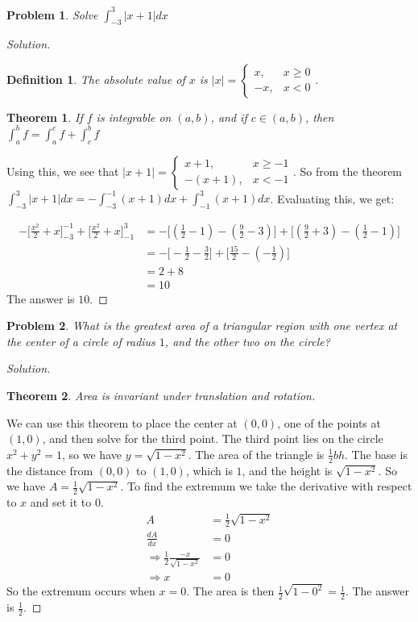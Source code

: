 \documentclass[oneside]{book}
\theoremstyle{mystyle}
\newtheorem{problem}{Problem}[section]
\newtheorem*{theorem*}{Theorem}
\newtheorem*{definition*}{Definition}
\begin{document}
\begin{problem}
Solve $\int_{-3}^{3}|x+1|dx$
\end{problem}
\begin{proof}[Solution]
\begin{definition*}
The absolute value of $x$ is $|x| = \begin{cases}x, & x\geq 0 \\ -x, & x<0\end{cases}$.
\end{definition*}
\begin{theorem*}
If $f$ is integrable on $(a,b)$, and if $c\in (a,b)$, then $\int_{a}^{b} f = \int_{a}^{c}f + \int_{c}^{b} f$
\end{theorem*}
\noindent Using this, we see that $|x+1| = \begin{cases} x+1, & x\geq -1 \\ -(x+1), & x < -1\end{cases}$. So from the theorem $\int_{-3}^{3}|x+1|dx = -\int_{-3}^{-1}(x+1)dx + \int_{-1}^{3}(x+1)dx$. Evaluating this, we get:

\begin{align}
    \nonumber -\bigg[\frac{x^2}{2}+x\bigg]_{-3}^{-1} + \bigg[\frac{x^2}{2}+x\bigg]_{-1}^{3} &= -\bigg[(\frac{1}{2} - 1) - (\frac{9}{2} - 3)\bigg] + \bigg[(\frac{9}{2} + 3) - (\frac{1}{2} - 1)\bigg] \\
    \nonumber &= -\bigg[-\frac{1}{2} - \frac{3}{2}\bigg] + \bigg[\frac{15}{2} - (-\frac{1}{2})\bigg] \\
    \nonumber &= 2 + 8 \\ 
    \nonumber &= 10
\end{align}
The answer is $10$.
\end{proof}

\begin{problem}
What is the greatest area of a triangular region with one vertex at the center of a circle of radius $1$, and the other two on the circle?
\end{problem}
\begin{proof}[Solution]
\begin{theorem*}
Area is invariant under translation and rotation.
\end{theorem*}
We can use this theorem to place the center at $(0,0)$, one of the points at $(1,0)$, and then solve for the third point. The third point lies on the circle $x^2+y^2 = 1$, so we have $y = \sqrt{1-x^2}$. The area of the triangle is $\frac{1}{2}bh$. The base is the distance from $(0,0)$ to $(1,0)$, which is $1$, and the height is $\sqrt{1-x^2}$. So we have $A = \frac{1}{2}\sqrt{1-x^2}$. To find the extremum we take the derivative with respect to $x$ and set it to $0$.
\begin{align}
    \nonumber A &= \frac{1}{2}\sqrt{1-x^2} \\
    \nonumber \frac{dA}{dx} &= 0 \\
    \nonumber \Rightarrow \frac{1}{2}\frac{-x}{\sqrt{1-x^2}} &=0 \\
    \nonumber \Rightarrow x &= 0
\end{align}
So the extremum occurs when $x=0$. The area is then $\frac{1}{2}\sqrt{1-0^2} = \frac{1}{2}$. The answer is $\frac{1}{2}$.
\end{proof}
\end{document}
